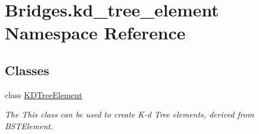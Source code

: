 \hypertarget{namespace_bridges_1_1kd__tree__element}{}\section{Bridges.\+kd\+\_\+tree\+\_\+element Namespace Reference}
\label{namespace_bridges_1_1kd__tree__element}
\subsection*{Classes}
\begin{DoxyCompactItemize}
\item 
class \mbox{\hyperlink{class_bridges_1_1kd__tree__element_1_1_k_d_tree_element}{K\+D\+Tree\+Element}}
\begin{DoxyCompactList}\small\item\em The This class can be used to create K-\/d Tree elements, derived from B\+S\+T\+Element. \end{DoxyCompactList}\end{DoxyCompactItemize}
